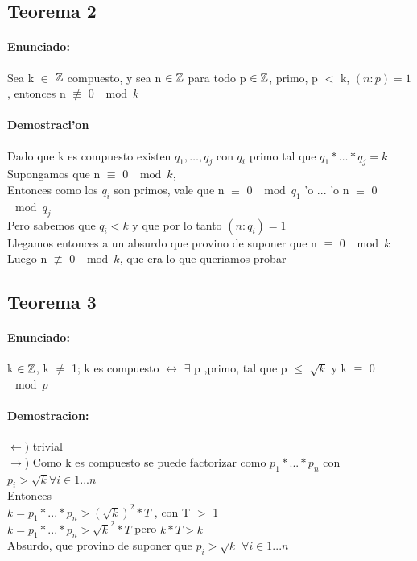 \subsection{Teorema 2}
\paragraph{Enunciado:}
Sea k $\in$ ${\mathbb Z}$ compuesto, y sea n ${\in {\mathbb Z}}$ para todo p ${\in {\mathbb Z}}$, primo, p $<$ k, $(n:p) = 1$, entonces n $\not\equiv$ 0 $\mod{k}$
\paragraph{Demostraci'on}
Dado que k es compuesto existen $q_1,\ldots,q_j$ con $q_i$ primo tal que $q_1*\ldots*q_j = k$ \\
Supongamos que n $\equiv$ 0 $\mod{k}$,\\
Entonces como los $q_i$ son primos, vale que n $\equiv$ 0 $\mod{q_1}$ 'o ... 'o n $\equiv$ 0 $\mod{q_j}$ \\
Pero sabemos que $q_i < k$ y que por lo tanto $(n:q_{i}) = 1$ \\
Llegamos entonces a un absurdo que provino de suponer que  n $\equiv$ 0 $\mod{k}$ \\ 
Luego n $\not\equiv$ 0 $\mod{k}$, que era lo que queriamos probar

\subsection{Teorema 3}
\paragraph{Enunciado:}
k ${\in {\mathbb Z}}$, k $\neq$ 1; k es compuesto $\longleftrightarrow$ $\exists$ p ,primo, tal que p $\leq$ $\sqrt{k}$ y k $\equiv$ 0 $\mod{p}$ \\
\paragraph{Demostracion:}
$\leftarrow)$ trivial \\
$\rightarrow$) Como k es compuesto se puede factorizar como $p_1*...*p_n$ con $p_i > \sqrt{k} \forall i \in {1...n}$\\
Entonces \\
$k = p_1*...*p_n > (\sqrt{k})^2* T $ , con T $>$ 1\\  
$k = p_1*...*p_n > \sqrt{k}^2* T$ pero $k*T > k$ \\
Absurdo, que provino de suponer que $p_i > \sqrt{k}$ $\forall i \in {1...n}$\\

